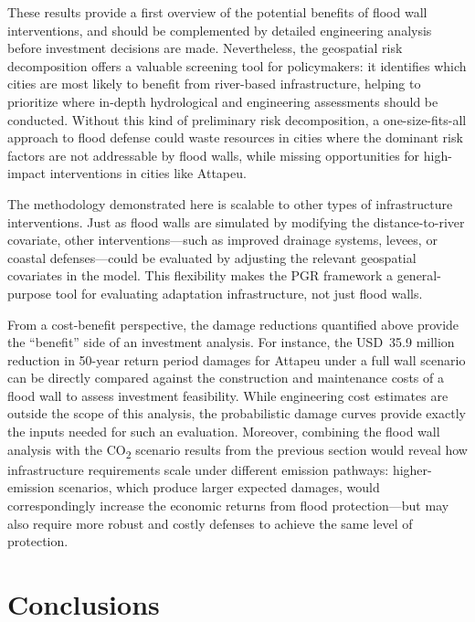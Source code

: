 \documentclass[11pt,a4paper]{article}
\begin{document}
These results provide a first overview of the potential benefits of flood wall interventions, and should be complemented by detailed engineering analysis before investment decisions are made. Nevertheless, the geospatial risk decomposition offers a valuable screening tool for policymakers: it identifies which cities are most likely to benefit from river-based infrastructure, helping to prioritize where in-depth hydrological and engineering assessments should be conducted. Without this kind of preliminary risk decomposition, a one-size-fits-all approach to flood defense could waste resources in cities where the dominant risk factors are not addressable by flood walls, while missing opportunities for high-impact interventions in cities like Attapeu.

The methodology demonstrated here is scalable to other types of infrastructure interventions. Just as flood walls are simulated by modifying the distance-to-river covariate, other interventions---such as improved drainage systems, levees, or coastal defenses---could be evaluated by adjusting the relevant geospatial covariates in the model. This flexibility makes the PGR framework a general-purpose tool for evaluating adaptation infrastructure, not just flood walls.

From a cost-benefit perspective, the damage reductions quantified above provide the ``benefit'' side of an investment analysis. For instance, the USD~35.9 million reduction in 50-year return period damages for Attapeu under a full wall scenario can be directly compared against the construction and maintenance costs of a flood wall to assess investment feasibility. While engineering cost estimates are outside the scope of this analysis, the probabilistic damage curves provide exactly the inputs needed for such an evaluation. Moreover, combining the flood wall analysis with the CO\textsubscript{2} scenario results from the previous section would reveal how infrastructure requirements scale under different emission pathways: higher-emission scenarios, which produce larger expected damages, would correspondingly increase the economic returns from flood protection---but may also require more robust and costly defenses to achieve the same level of protection.

\section{Conclusions}
\end{document}
